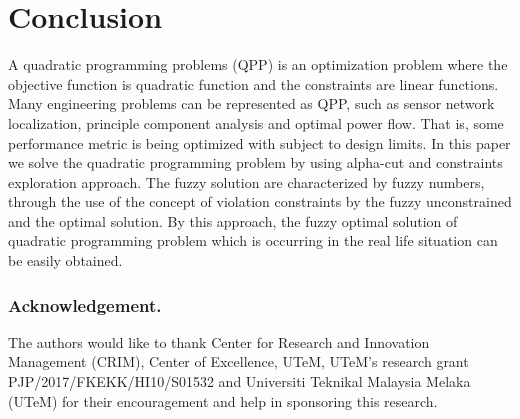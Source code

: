 \documentclass{iaesarticle3}
\begin{document}
\section{Conclusion}
A quadratic programming problems (QPP) is an optimization problem where the objective function is quadratic function and the constraints are linear functions. Many engineering problems can be represented as QPP, such as sensor network localization, principle component analysis and optimal power flow. That is, some performance metric is being optimized with subject to design limits. In this paper we solve the quadratic programming problem by using alpha-cut and constraints exploration approach. The fuzzy solution are characterized by fuzzy numbers, through the use of the concept of violation constraints by the fuzzy unconstrained and the optimal solution. By this approach, the fuzzy optimal solution of quadratic programming problem which is occurring in the real life situation can be easily obtained.


\subsubsection*{Acknowledgement.}
The authors would like to thank Center for Research and Innovation Management (CRIM), Center of Excellence, UTeM, UTeM's research grant PJP/2017/FKEKK/HI10/S01532 and Universiti Teknikal Malaysia Melaka (UTeM) for their encouragement and help in sponsoring this research.
\end{document}
